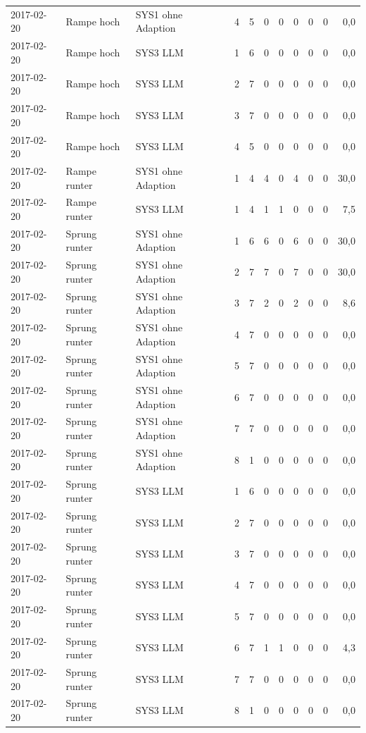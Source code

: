 \begin{tabular}{lllrrrrrrrr}
2017-02-20 & Rampe hoch & SYS1 ohne Adaption & 4 & 5 & 0 & 0 & 0 & 0 & 0 & 0,0 \\
2017-02-20 & Rampe hoch & SYS3 LLM & 1 & 6 & 0 & 0 & 0 & 0 & 0 & 0,0 \\
2017-02-20 & Rampe hoch & SYS3 LLM & 2 & 7 & 0 & 0 & 0 & 0 & 0 & 0,0 \\
2017-02-20 & Rampe hoch & SYS3 LLM & 3 & 7 & 0 & 0 & 0 & 0 & 0 & 0,0 \\
2017-02-20 & Rampe hoch & SYS3 LLM & 4 & 5 & 0 & 0 & 0 & 0 & 0 & 0,0 \\
2017-02-20 & Rampe runter & SYS1 ohne Adaption & 1 & 4 & 4 & 0 & 4 & 0 & 0 & 30,0 \\
2017-02-20 & Rampe runter & SYS3 LLM & 1 & 4 & 1 & 1 & 0 & 0 & 0 & 7,5 \\
2017-02-20 & Sprung runter & SYS1 ohne Adaption & 1 & 6 & 6 & 0 & 6 & 0 & 0 & 30,0 \\
2017-02-20 & Sprung runter & SYS1 ohne Adaption & 2 & 7 & 7 & 0 & 7 & 0 & 0 & 30,0 \\
2017-02-20 & Sprung runter & SYS1 ohne Adaption & 3 & 7 & 2 & 0 & 2 & 0 & 0 & 8,6 \\
2017-02-20 & Sprung runter & SYS1 ohne Adaption & 4 & 7 & 0 & 0 & 0 & 0 & 0 & 0,0 \\
2017-02-20 & Sprung runter & SYS1 ohne Adaption & 5 & 7 & 0 & 0 & 0 & 0 & 0 & 0,0 \\
2017-02-20 & Sprung runter & SYS1 ohne Adaption & 6 & 7 & 0 & 0 & 0 & 0 & 0 & 0,0 \\
2017-02-20 & Sprung runter & SYS1 ohne Adaption & 7 & 7 & 0 & 0 & 0 & 0 & 0 & 0,0 \\
2017-02-20 & Sprung runter & SYS1 ohne Adaption & 8 & 1 & 0 & 0 & 0 & 0 & 0 & 0,0 \\
2017-02-20 & Sprung runter & SYS3 LLM & 1 & 6 & 0 & 0 & 0 & 0 & 0 & 0,0 \\
2017-02-20 & Sprung runter & SYS3 LLM & 2 & 7 & 0 & 0 & 0 & 0 & 0 & 0,0 \\
2017-02-20 & Sprung runter & SYS3 LLM & 3 & 7 & 0 & 0 & 0 & 0 & 0 & 0,0 \\
2017-02-20 & Sprung runter & SYS3 LLM & 4 & 7 & 0 & 0 & 0 & 0 & 0 & 0,0 \\
2017-02-20 & Sprung runter & SYS3 LLM & 5 & 7 & 0 & 0 & 0 & 0 & 0 & 0,0 \\
2017-02-20 & Sprung runter & SYS3 LLM & 6 & 7 & 1 & 1 & 0 & 0 & 0 & 4,3 \\
2017-02-20 & Sprung runter & SYS3 LLM & 7 & 7 & 0 & 0 & 0 & 0 & 0 & 0,0 \\
2017-02-20 & Sprung runter & SYS3 LLM & 8 & 1 & 0 & 0 & 0 & 0 & 0 & 0,0 \\
\bottomrule
\end{tabular}
